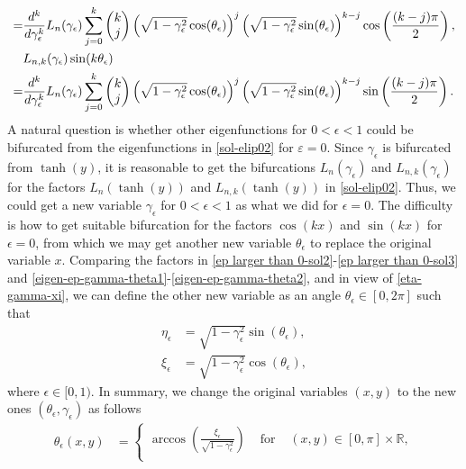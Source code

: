 \documentclass[1 [leqno, 11pt]{amsart}
\numberwithin{equation}{section}
\let\ep=\epsilon
\begin{document}
\begin{CJK*}{GBK}{song}
\begin{align}
=&
 {d^k\over d\gamma_\ep^k}L_n(\gamma_\ep) \sum_{j=0}^k\begin{pmatrix}k\\j\end{pmatrix}\left(\sqrt{1-\gamma_\ep^2}\cos(\theta_\ep)\right)^j\left(\sqrt{1-\gamma_\ep^2}\sin(\theta_\ep)\right)^{k-j}\cos\left({(k-j)\pi\over2}\right),\\\nonumber
 &L_{n,k}(\gamma_\epsilon)\sin(k\theta_\epsilon)\\\label{eigen-ep-gamma-theta2}
=&
 {d^k\over d\gamma_\ep^k}L_n(\gamma_\ep) \sum_{j=0}^k\begin{pmatrix}k\\j\end{pmatrix}\left(\sqrt{1-\gamma_\ep^2}\cos(\theta_\ep)\right)^j\left(\sqrt{1-\gamma_\ep^2}\sin(\theta_\ep)\right)^{k-j}\sin\left({(k-j)\pi\over2}\right).
  \end{align}
A natural question is whether other eigenfunctions for $0<\epsilon<1$ could be bifurcated  from the eigenfunctions in \eqref{sol-elip02}  for $\varepsilon=0$. Since $\gamma_\ep$ is bifurcated from $\tanh(y)$,  it is reasonable to get the bifurcations  $L_{n}(\gamma_\ep)$ and $L_{n,k}(\gamma_\ep)$  for the factors $L_{n}(\tanh(y))$ and $L_{n,k}(\tanh(y))$  in \eqref{sol-elip02}.
Thus, we could get a new variable $\gamma_\ep$  for $0<\epsilon<1$ as what we did for $\epsilon=0$.
The   difficulty is how to get suitable bifurcation for  the factors  $\cos(kx)$ and $\sin(kx)$ for $\epsilon=0$, from which we may get
another new variable $\theta_\ep$ to replace the original variable $x$.
\fi
Comparing the factors in  \eqref{ep larger than 0-sol2}-\eqref{ep larger than 0-sol3} and \eqref{eigen-ep-gamma-theta1}-\eqref{eigen-ep-gamma-theta2}, and in view of  \eqref{eta-gamma-xi}, we can
define the other new variable as  an angle $\theta_\ep \in [0, 2\pi]$ such that
\begin{align}\label{def-eta-ep}
\eta_\ep& = \sqrt{1-\gamma_\ep^2} \sin(\theta_\ep), \\\label{def-xi-ep}
\xi_\ep& = \sqrt{1-\gamma_\ep^2} \cos(\theta_\ep),
\end{align}
where $\ep\in[0,1)$. In summary, we change the original variables $(x,y)$ to the new ones  $(\theta_\ep,\gamma_\ep)$ as follows
 \begin{align} \label{transf1}
 \theta_\ep(x,y) & = \left\{ \begin{array}{rcl} \arccos \left( \frac{\xi_\ep}{\sqrt{1-\gamma_\ep^2}} \right) & \mbox{ for } & (x,y) \in [0, \pi]\times\mathbb{R}, \\

\end{array}
\end{align}
\end{CJK*}
\end{document}
